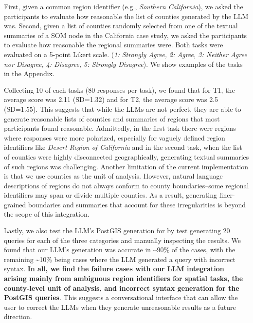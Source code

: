 First, given a common region identifier (e.g., \textit{Southern California}), we asked the participants to evaluate how reasonable the list of counties generated by the LLM was.
%
Second, given a list of counties randomly selected from one of the textual summaries of a SOM node in the California case study, we asked the participants to evaluate how reasonable the regional summaries were.
%
Both tasks were evaluated on a 5-point Likert scale. (\textit{1: Strongly Agree, 2: Agree, 3: Neither Agree nor Disagree, 4: Disagree, 5: Strongly Disagree}).
%
We show examples of the tasks in the Appendix.

Collecting 10 of each tasks (80 responses per task), we found that for T1, the average score was 2.11 (SD=1.32) and for T2, the average score was 2.5 (SD=1.55).
%
This suggests that while the LLMs are not perfect, they are able to generate reasonable lists of counties and summaries of regions that most participants found reasonable.
%
Admittedly, in the first task there were regions where responses were more polarized, especially for vaguely defined region identifiers like \textit{Desert Region of California} and in the second task, when the list of counties were highly disconnected geographically, generating textual summaries of such regions was challenging.
%
Another limitation of the current implementation is that we use counties as the unit of analysis. 
%
However, natural language descriptions of regions do not always conform to county boundaries--some regional identifiers may span or divide multiple counties. As a result, generating finer-grained boundaries and summaries that account for these irregularities is beyond the scope of this integration.

Lastly, we also test the LLM's PostGIS generation for \ClimateSOM by test generating 20 queries for each of the three categories and manually inspecting the results.
%
We found that our LLM's generation was accurate in \textasciitilde 90\% of the cases, with the remaining \textasciitilde 10\% being cases where the LLM generated a query with incorrect syntax.
%
\textbf{In all, we find the failure cases with our LLM integration arising mainly from ambiguous region identifiers for spatial tasks, the county-level unit of analysis, and incorrect syntax generation for the PostGIS queries}.
%
This suggests a conversational interface that can allow the user to correct the LLMs when they generate unreasonable results as a future direction.
